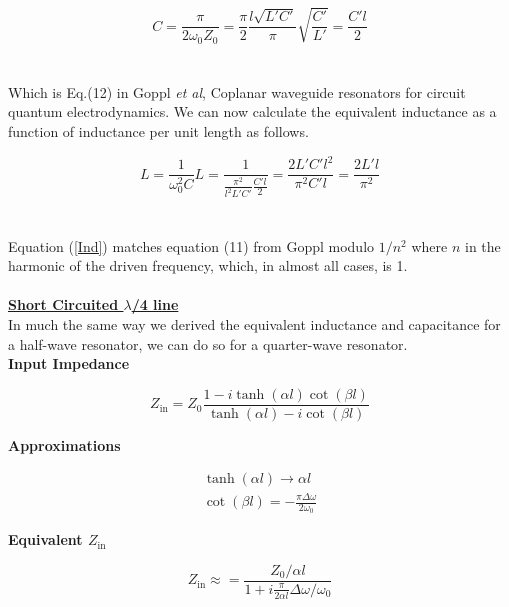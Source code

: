 \documentclass[12pt,reqno]{amsart}
\begin{document}
\begin{equation}
	C = \frac{\pi}{2\omega_0 Z_0} = \frac{\pi}{2} \frac{l \sqrt{L'C'}}{\pi} \sqrt{\frac{C'}{L'}} = \frac{C' l}{2} \label{cHalf}
\end{equation}
\\ \ \\
 Which is Eq.(12) in Goppl \textit{et al}, Coplanar waveguide resonators for circuit quantum electrodynamics. We can now calculate the equivalent inductance as a function of inductance per unit length as follows.
 
 \begin{subequations}
 	\begin{equation}
	L = \frac{1}{\omega_0^2 C}
	\end{equation}
	\begin{equation}
	L = \frac{1}{\frac{\pi^2}{l^2 L'C'} \frac{C' l}{2} } = \frac{2 L' C' l^2}{\pi^2 C' l} = \frac{2 L' l}{\pi^2} \label{Ind}
	\end{equation}
 \end{subequations}
 \\ \ \\
 Equation (\ref{Ind}) matches equation (11) from Goppl modulo $1/n^2$ where $n$ in the harmonic of the driven frequency, which, in almost all cases, is 1.
\\ \ \\
\textbf{\underline{Short Circuited $\lambda$/4 line}} \\

In much the same way we derived the equivalent inductance and capacitance for a half-wave resonator, we can do so for a quarter-wave resonator. \\

\textbf{Input Impedance}

\begin{equation}
Z_\text{in} = Z_0 \frac{1 - i \tanh (\alpha l) \cot(\beta l)}{\tanh(\alpha l) - i\cot(\beta l)}
\end{equation}

\textbf{Approximations}

\begin{eqnarray}
\tanh(\alpha l) \rightarrow \alpha l \\
\cot(\beta l) = - \frac{\pi \Delta\omega}{2\omega_0}
\end{eqnarray}

\textbf{Equivalent $Z_\text{in}$}

\begin{equation}
Z_\text{in} \approx = \frac{Z_0/\alpha l}{1 + i \frac{\pi}{2 \alpha l}\Delta \omega / \omega_0}
\end{equation}
\end{document}
